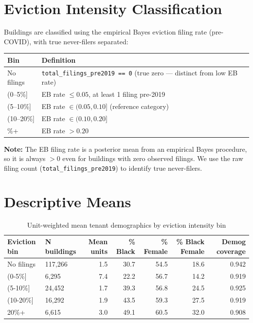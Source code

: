 \documentclass[
  11pt,
]{article}
\begin{document}
\section{Eviction Intensity
Classification}\label{eviction-intensity-classification}

Buildings are classified using the empirical Bayes eviction filing rate
(pre-COVID), with true never-filers separated:

\begin{longtable}[]{@{}
  >{\raggedright\arraybackslash}p{}
  >{\raggedright\arraybackslash}p{}@{}}
\toprule\noalign{}
\begin{minipage}[b]{\linewidth}\raggedright
Bin
\end{minipage} & \begin{minipage}[b]{\linewidth}\raggedright
Definition
\end{minipage} \\
\midrule\noalign{}
\endhead
\bottomrule\noalign{}
\endlastfoot
No filings & \texttt{total\_filings\_pre2019\ ==\ 0} (true zero ---
distinct from low EB rate) \\
(0--5\%{]} & EB rate \(\leq 0.05\), at least 1 filing pre-2019 \\
(5--10\%{]} & EB rate \(\in (0.05, 0.10]\) (reference category) \\
(10--20\%{]} & EB rate \(\in (0.10, 0.20]\) \\
20\%+ & EB rate \(> 0.20\) \\
\end{longtable}

\textbf{Note:} The EB filing rate is a posterior mean from an empirical
Bayes procedure, so it is always \(> 0\) even for buildings with zero
observed filings. We use the raw filing count
(\texttt{total\_filings\_pre2019}) to identify true never-filers.

\section{Descriptive Means}\label{descriptive-means}

\begin{longtable}[t]{llrrrrr}
\caption{\label{tab:desc-table}Unit-weighted mean tenant demographics by eviction intensity bin}\\
\toprule
Eviction bin & N buildings & Mean units & \% Black & \% Female & \% Black Female & Demog coverage\\
\midrule
No filings & 117,266 & 1.5 & 30.7 & 54.5 & 18.6 & 0.942\\
(0-5\%] & 6,295 & 7.4 & 22.2 & 56.7 & 14.2 & 0.919\\
(5-10\%] & 24,452 & 1.7 & 39.3 & 56.8 & 24.5 & 0.925\\
(10-20\%] & 16,292 & 1.9 & 43.5 & 59.3 & 27.5 & 0.919\\
20\%+ & 6,615 & 3.0 & 49.1 & 60.5 & 32.0 & 0.908\\
\bottomrule
\end{longtable}
\end{document}
